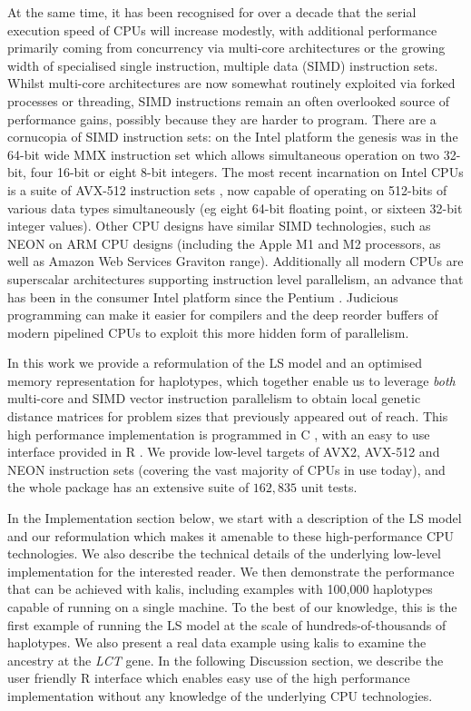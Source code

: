 \documentclass[pdflatex,referee,lineno,sn-nature]{sn-jnl}%
\let\proglang=\textsf
\newcommand{\pkg}[1]{{\fontseries{m}\fontseries{b}\selectfont #1}}
\begin{document}
At the same time, it has been recognised for over a decade \cite{sutter2005free} that the serial execution speed of CPUs will increase modestly, with additional performance primarily coming from concurrency via multi-core architectures or the growing width of specialised single instruction, multiple data (SIMD) instruction sets.
Whilst multi-core architectures are now somewhat routinely exploited via forked processes or threading, SIMD instructions remain an often overlooked source of performance gains, possibly because they are harder to program.
There are a cornucopia of SIMD instruction sets: on the Intel platform the genesis was in the 64-bit wide MMX instruction set \cite{mmx} which allows simultaneous operation on two 32-bit, four 16-bit or eight 8-bit integers.
The most recent incarnation on Intel CPUs is a suite of AVX-512 instruction sets \cite{intelisa}, now capable of operating on 512-bits of various data types simultaneously (eg eight 64-bit floating point, or sixteen 32-bit integer values).
Other CPU designs have similar SIMD technologies, such as NEON on ARM CPU \cite{armneon} designs (including the Apple M1 and M2 processors, as well as Amazon Web Services Graviton range).
Additionally all modern CPUs are superscalar architectures supporting instruction level parallelism, an advance that has been in the consumer Intel platform since the Pentium \cite{pentium}.
Judicious programming can make it easier for compilers and the deep reorder buffers of modern pipelined CPUs to exploit this more hidden form of parallelism.

In this work we provide a reformulation of the LS model and an optimised memory representation for haplotypes, which together enable us to leverage \emph{both} multi-core and SIMD vector instruction parallelism to obtain local genetic distance matrices for problem sizes that previously appeared out of reach.
This high performance implementation is programmed in \proglang{C} \cite{C18}, with an easy to use interface provided in \proglang{R} \cite{R}.
We provide low-level targets of AVX2, AVX-512 and NEON instruction sets (covering the vast majority of CPUs in use today), and the whole package has an extensive suite of \(162,835\) unit tests.

In the Implementation section below, we start with a description of the LS model and our reformulation which makes it amenable to these high-performance CPU technologies.
We also describe the technical details of the underlying low-level implementation for the interested reader.
We then demonstrate the performance that can be achieved with \pkg{kalis}, including examples with 100,000 haplotypes capable of running on a single machine.
To the best of our knowledge, this is the first example of running the LS model at the scale of hundreds-of-thousands of haplotypes.
We also present a real data example using \pkg{kalis} to examine the ancestry at the \emph{LCT} gene.
In the following Discussion section, we describe the user friendly \proglang{R} interface which enables easy use of the high performance implementation without any knowledge of the underlying CPU technologies.
\end{document}
